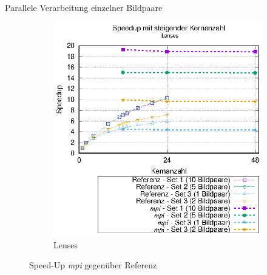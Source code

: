 \begin{frame}[allowframebreaks]{Parallele Verarbeitung einzelner Bildpaare}
\begin{figure}[h]
\begin{subfigure}[b]{0.47\textwidth}
			\includegraphics[width=\textwidth]{pdf/mpi_speedup_lenses}
			\caption{Lenses}
		\end{subfigure}
		\caption{Speed-Up \textit{mpi} gegenüber Referenz}
	\end{figure}
	
	\framebreak
	

\end{frame}
